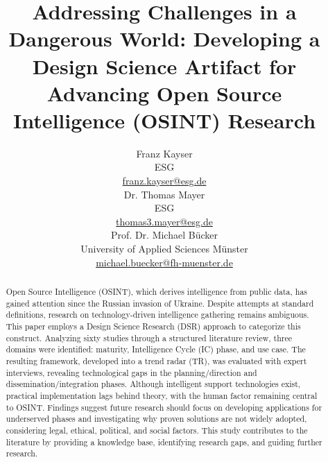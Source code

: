 \documentclass[10pt]{article}
\title{Addressing Challenges in a Dangerous World: Developing a Design Science Artifact for Advancing Open Source Intelligence (OSINT) Research}
\author{Franz Kayser\\
ESG \\
 {\underline{ franz.kayser@esg.de}} \\\And
 Dr. Thomas Mayer \\
 ESG \\
 {\underline{ thomas3.mayer@esg.de} }\\\And 
 Prof. Dr. Michael Bücker \\
University of Applied Sciences Münster\\
 {\underline{michael.buecker@fh-muenster.de}} \\}
\date{}
\begin{document}
\maketitle
\begin{abstract}
    Open Source Intelligence (OSINT), which derives intelligence from public data, has gained attention since the Russian invasion of Ukraine. Despite attempts at standard definitions, research on technology-driven intelligence gathering remains ambiguous. This paper employs a Design Science Research (DSR) approach to categorize this construct. Analyzing sixty studies through a structured literature review, three domains were identified: maturity, Intelligence Cycle (IC) phase, and use case. The resulting framework, developed into a trend radar (TR), was evaluated with expert interviews, revealing technological gaps in the planning/direction and dissemination/integration phases. Although intelligent support technologies exist, practical implementation lags behind theory, with the human factor remaining central to OSINT. Findings suggest future research should focus on developing applications for underserved phases and investigating why proven solutions are not widely adopted, considering legal, ethical, political, and social factors. This study contributes to the literature by providing a knowledge base, identifying research gaps, and guiding further research.
\end{abstract}
\end{document}
